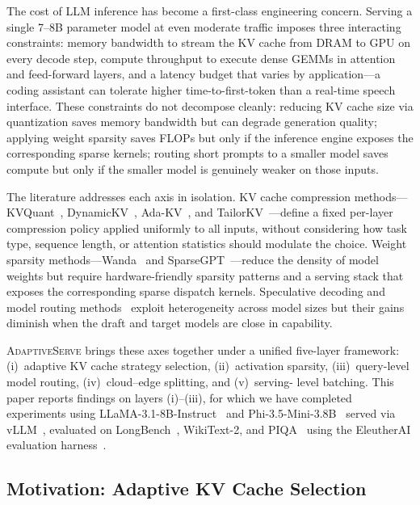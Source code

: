 \documentclass[conference]{IEEEtran}
\begin{document}
The cost of LLM inference has become a first-class engineering concern.
Serving a single 7--8B parameter model at even moderate traffic imposes three
interacting constraints: memory bandwidth to stream the KV cache from DRAM to
GPU on every decode step, compute throughput to execute dense GEMMs in
attention and feed-forward layers, and a latency budget that varies by
application---a coding assistant can tolerate higher time-to-first-token than a
real-time speech interface.
These constraints do not decompose cleanly: reducing KV cache size via
quantization saves memory bandwidth but can degrade generation quality;
applying weight sparsity saves FLOPs but only if the inference engine exposes
the corresponding sparse kernels; routing short prompts to a smaller model
saves compute but only if the smaller model is genuinely weaker on those
inputs.

The literature addresses each axis in isolation.
KV cache compression methods---KVQuant~\cite{hooper2024kvquant},
DynamicKV~\cite{dynamickv}, Ada-KV~\cite{adakv}, and
TailorKV~\cite{tailorkv}---define a fixed per-layer compression policy applied
uniformly to all inputs, without considering how task type, sequence length, or
attention statistics should modulate the choice.
Weight sparsity methods---Wanda~\cite{sun2024wanda} and
SparseGPT~\cite{frantar2023sparsegpt}---reduce the density of model weights
but require hardware-friendly sparsity patterns and a serving stack that
exposes the corresponding sparse dispatch kernels.
Speculative decoding and model routing methods~\cite{leviathan2023speculative,%
chen2023speculative} exploit heterogeneity across model sizes but their gains
diminish when the draft and target models are close in capability.

\textsc{AdaptiveServe} brings these axes together under a unified five-layer
framework: (i)~adaptive KV cache strategy selection, (ii)~activation sparsity,
(iii)~query-level model routing, (iv)~cloud--edge splitting, and (v)~serving-
level batching.
This paper reports findings on layers (i)--(iii), for which we have completed
experiments using LLaMA-3.1-8B-Instruct~\cite{llama3} and
Phi-3.5-Mini-3.8B~\cite{phi3} served via vLLM~\cite{vllm}, evaluated on
LongBench~\cite{longbench}, WikiText-2, and PIQA~\cite{piqa} using the
EleutherAI evaluation harness~\cite{lmeval}.

\subsection{Motivation: Adaptive KV Cache Selection}
\label{sec:intro:kvcache}
\end{document}
